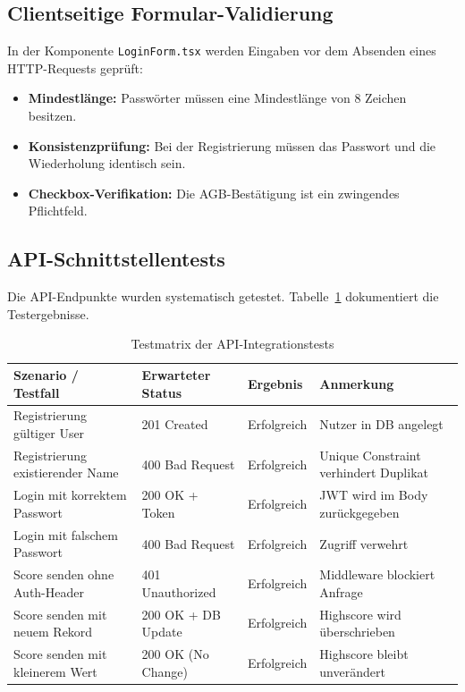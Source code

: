 \documentclass[12pt,a4paper]{article}
\begin{document}
\subsection{Clientseitige Formular-Validierung}
In der Komponente \texttt{LoginForm.tsx} werden Eingaben vor dem Absenden eines HTTP-Requests geprüft:
\begin{itemize}
  \item \textbf{Mindestlänge:} Passwörter müssen eine Mindestlänge von 8 Zeichen besitzen.
  \item \textbf{Konsistenzprüfung:} Bei der Registrierung müssen das Passwort und die Wiederholung identisch sein.
  \item \textbf{Checkbox-Verifikation:} Die AGB-Bestätigung ist ein zwingendes Pflichtfeld.
\end{itemize}

\subsection{API-Schnittstellentests}
Die API-Endpunkte wurden systematisch getestet. Tabelle~\ref{tab:test-results-extended} dokumentiert die Testergebnisse.

\begin{table}[htbp]
  \centering 
  \begin{tabularx}{\textwidth}{XllX}
    \toprule
    \textbf{Szenario / Testfall} & \textbf{Erwarteter Status} & \textbf{Ergebnis} & \textbf{Anmerkung} \\ \midrule
    Registrierung gültiger User & 201 Created & Erfolgreich & Nutzer in DB angelegt \\
    Registrierung existierender Name & 400 Bad Request & Erfolgreich & Unique Constraint verhindert Duplikat \\
    Login mit korrektem Passwort & 200 OK + Token & Erfolgreich & JWT wird im Body zurückgegeben \\
    Login mit falschem Passwort & 400 Bad Request & Erfolgreich & Zugriff verwehrt \\
    Score senden ohne Auth-Header & 401 Unauthorized & Erfolgreich & Middleware blockiert Anfrage \\
    Score senden mit neuem Rekord & 200 OK + DB Update & Erfolgreich & Highscore wird überschrieben \\
    Score senden mit kleinerem Wert & 200 OK (No Change) & Erfolgreich & Highscore bleibt unverändert \\ \bottomrule
  \end{tabularx}
  \caption{Testmatrix der API-Integrationstests}
  \label{tab:test-results-extended}
\end{table}
\end{document}
